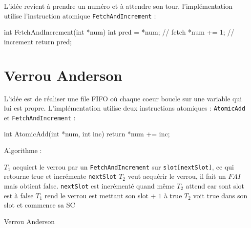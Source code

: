 \documentclass[11pt,a4paper]{report}
\begin{document}
L'idée revient à prendre un numéro et à attendre son tour, l'implémentation utilise l'instruction atomique \texttt{FetchAndIncrement} :

\begin{ccode}
    int FetchAndIncrement(int *num)
    {
        int pred = *num;    // fetch
        *num += 1;          // increment
        return pred;
    } 
\end{ccode}


\section{Verrou Anderson} %
\label{sec:Verrou Anderson}

L'idée est de réaliser une file FIFO où chaque coeur boucle sur une variable qui lui est propre. L'implémentation utilise deux instructions atomiques : \texttt{AtomicAdd} et \texttt{FetchAndIncrement} :

\begin{ccode}
    int AtomicAdd(int *num, int inc)
    {
        return *num += inc;
    }    
\end{ccode}

Algorithme :

\begin{algorithm}[h] %
    $T_1$ acquiert le verrou par un \texttt{FetchAndIncrement} sur \verb|slot[nextSlot]|, ce qui retourne true et incrémente \verb|nextSlot|\;
    $T_2$ veut acquérir le verrou, il fait un $FAI$ mais obtient false. \verb|nextSlot| est incrémenté quand même\;
    $T_2$ attend car sont slot est à false\;
    $T_1$ rend le verrou est mettant son slot + $1$ à true\;
    $T_2$ voit true dans son slot et commence sa SC\;
    \caption{Verrou Anderson}
    \label{algo:verrou-anderson}
\end{algorithm} %
\end{document}
